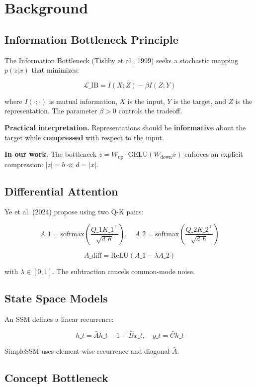 \section{Background}

\subsection{Information Bottleneck Principle}

The Information Bottleneck (Tishby et al., 1999) seeks a stochastic 
mapping $p(z | x)$ that minimizes:

\[
\mathcal{L}\_\text{IB} = I(X; Z) - \beta I(Z; Y)
\tag{3.1}
\]

where $I(\cdot; \cdot)$ is mutual information, $X$ is the input, $Y$ is 
the target, and $Z$ is the representation. The parameter $\beta > 0$ 
controls the tradeoff.

\textbf{Practical interpretation.} Representations should be \textbf{informative} 
about the target while \textbf{compressed} with respect to the input.

\textbf{In our work.} The bottleneck $z = W_\text{up} \cdot \text{GELU}(W_\text{down} x)$ 
enforces an explicit compression: $|z| = b \ll d = |x|$.

\subsection{Differential Attention}

Ye et al. (2024) propose using two Q-K pairs:

\[
A\_1 = \text{softmax}\!\left(\frac{Q\_1 K\_1^\top}{\sqrt{d\_h}}\right), \quad
A\_2 = \text{softmax}\!\left(\frac{Q\_2 K\_2^\top}{\sqrt{d\_h}}\right)
\tag{3.2}
\]

\[
A\_\text{diff} = \text{ReLU}(A\_1 - \lambda A\_2)
\tag{3.3}
\]

with $\lambda \in [0, 1]$. The subtraction cancels common-mode noise.

\subsection{State Space Models}

An SSM defines a linear recurrence:

\[
h\_t = \bar{A} h\_{t-1} + \bar{B} x\_t, \quad
y\_t = \bar{C} h\_t
\tag{3.4}
\]

SimpleSSM uses element-wise recurrence and diagonal $\bar{A}$.

\subsection{Concept Bottleneck}

